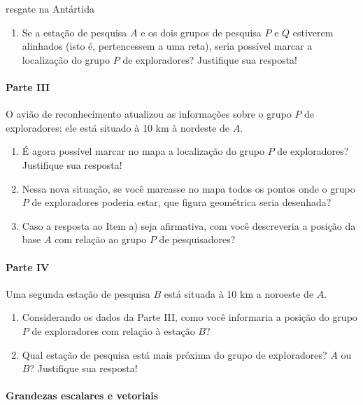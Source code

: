 \begin{task}{resgate na Antártida}
\begin{enumerate}
\item {} 
Se a estação de pesquisa \(A\) e os dois grupos de pesquisa \(P\) e \(Q\) estiverem alinhados (isto é, pertencessem a uma reta), seria possível marcar a localização do grupo \(P\) de exploradores? Justifique sua resposta!

\end{enumerate}

\paragraph{Parte III}

O avião de reconhecimento atualizou as informações sobre o grupo \(P\) de exploradores: ele está situado à 10 km à nordeste de \(A\).
\begin{enumerate}
\item {} 
É agora possível marcar no mapa a localização do grupo \(P\) de exploradores? Justifique sua resposta!

\item {} 
Nessa nova situação, se você marcasse no mapa todos os pontos onde o grupo \(P\) de exploradores poderia estar, que figura geométrica seria desenhada?

\item {} 
Caso a resposta ao Item a) seja afirmativa, com você descreveria a posição da base \(A\) com relação ao grupo \(P\) de pesquisadores?

\end{enumerate}

\paragraph{Parte IV}

Uma segunda estação de pesquisa \(B\) está situada à 10 km a noroeste de \(A\).
\begin{enumerate}
\item {} 
Considerando os dados da Parte III, como você informaria a posição do grupo \(P\) de exploradores com relação à estação \(B\)?

\item {} 
Qual estação de pesquisa está mais próxima do grupo de exploradores? \(A\) ou \(B\)? Justifique sua resposta!

\end{enumerate}
\end{task}





\paragraph{Grandezas escalares e vetoriais}

